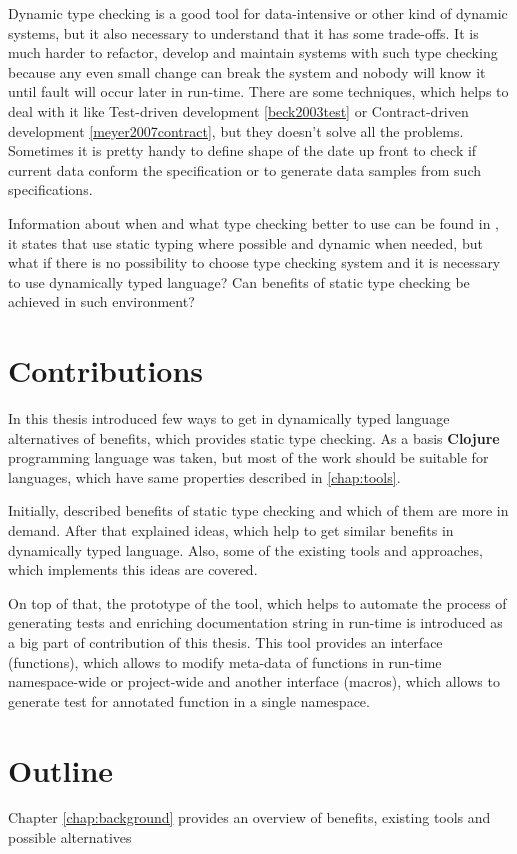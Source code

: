 Dynamic type checking is a good tool for data-intensive or other kind of dynamic
systems, but it also necessary to understand that it has some trade-offs. It is
much harder to refactor, develop and maintain systems with such type checking
because any even small change can break the system and nobody will know it until
fault will occur later in run-time. There are some techniques, which helps to
deal with it like Test-driven development \ref{beck2003test} or Contract-driven
development \ref{meyer2007contract}, but they doesn't solve all the problems.
Sometimes it is pretty handy to define shape of the date up front to check if
current data conform the specification or to generate data samples from such
specifications.

Information about when and what type checking better to use can be found in
\cite{meijer2004static}, it states that use static typing where possible and
dynamic when needed, but what if there is no possibility to choose type checking
system and it is necessary to use dynamically typed language? Can benefits of
static type checking be achieved in such environment?


\section{Contributions}
In this thesis introduced few ways to get in dynamically typed language
alternatives of benefits, which provides static type checking. As a basis
\textbf{Clojure} programming language was taken, but most of the work should be
suitable for languages, which have same properties described in
\ref{chap:tools}.

Initially, described benefits of static type checking and which of them are more
in demand. After that explained ideas, which help to get similar benefits in
dynamically typed language. Also, some of the existing tools and approaches,
which implements this ideas are covered.

On top of that, the prototype of the tool, which helps to automate the process
of generating tests and enriching documentation string in run-time is introduced
as a big part of contribution of this thesis. This tool provides an interface
(functions), which allows to modify meta-data of functions in run-time
namespace-wide or project-wide and another interface (macros), which allows to
generate test for annotated function in a single namespace.

\section{Outline}
Chapter \ref{chap:background} provides an overview of benefits, existing tools
and possible alternatives






